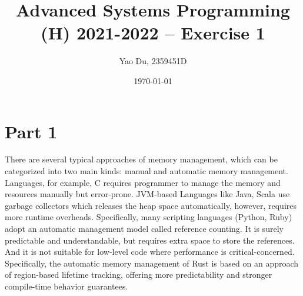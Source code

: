 \documentclass[10pt,a4paper,twocolumn]{article}
\begin{document}
\title{Advanced Systems Programming (H) 2021-2022 – Exercise 1}
\author{Yao Du, 2359451D}
\date{\today}

\maketitle 

\section*{Part 1}


    

There are several typical approaches of memory management, which can be categorized into two main kinds: manual and automatic memory management. Languages, for example, C requires programmer to manage the memory and resources manually but error-prone. JVM-based Languages like Java, Scala use garbage collectors which releases the heap space automatically, however, requires more runtime overheads. Specifically, many scripting languages (Python, Ruby) adopt an automatic management model called reference counting. It is surely predictable and understandable, but requires extra space to store the references. And it is not suitable for low-level code where performance is critical-concerned. Specifically, the automatic memory management of Rust is based on an approach of region-based lifetime tracking, offering more predictability and stronger compile-time behavior guarantees. 
\end{document}
